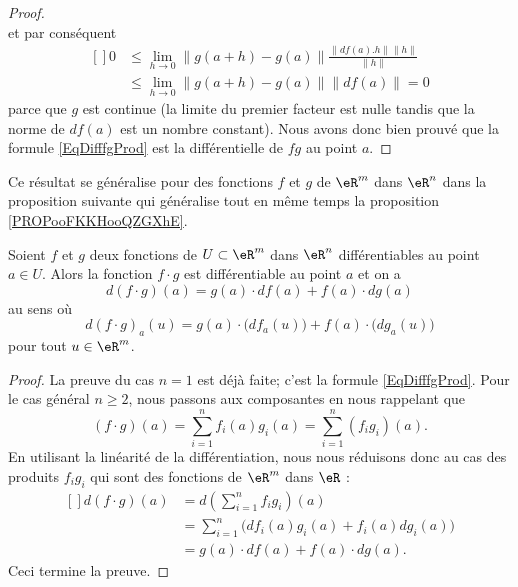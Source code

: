 \begin{proof}
\begin{equation}
	\end{equation}
	et par conséquent
	\begin{equation}
		\begin{aligned}[]
			0 & \leq\lim_{h\to 0} \| g(a+h)-g(a) \|\frac{ \| df(a).h \|\| h \| }{ \| h \| } \\
			  & \leq \lim_{h\to 0} \| g(a+h)-g(a) \|\| df(a) \|=0
		\end{aligned}
	\end{equation}
	parce que \( g\) est continue (la limite du premier facteur est nulle tandis que la norme de \( df(a)\) est un nombre constant). Nous avons donc bien prouvé que la formule \eqref{EqDifffgProd} est la différentielle de \( fg\) au point \( a\).
\end{proof}


Ce résultat se généralise pour des fonctions \( f\) et \( g\) de \( \eR^m\) dans \( \eR^n\) dans la proposition suivante qui généralise tout en même temps la proposition \ref{PROPooFKKHooQZGXhE}.
\begin{proposition}
	Soient \( f\) et \( g\) deux fonctions de \( U\subset\eR^m\) dans \( \eR^n\) différentiables au point \( a\in U\). Alors la fonction \( f\cdot g\) est différentiable  au point \( a\) et on a
	\begin{equation}
		d(f\cdot g)(a)=g(a)\cdot df(a)+f(a)\cdot dg(a)
	\end{equation}
	au sens où
	\begin{equation}		\label{Eqdfcdotgexpl}
		d(f\cdot g)_a(u)=g(a)\cdot\big( df_a(u) \big)+f(a)\cdot\big( dg_a(u) \big)
	\end{equation}
	pour tout \( u\in\eR^m\).
\end{proposition}

\begin{proof}
	La preuve du cas \( n=1\) est déjà faite; c'est la formule \eqref{EqDifffgProd}. Pour le cas général \( n\geq 2\), nous passons aux composantes en nous rappelant que
	\begin{equation}
		(f\cdot g)(a)=\sum_{i=1}^nf_i(a)g_i(a)=\sum_{i=1}^n(f_ig_i)(a).
	\end{equation}
	En utilisant la linéarité de la différentiation, nous nous réduisons donc au cas des produits \( f_ig_i\) qui sont des fonctions de \( \eR^m\) dans \( \eR\) :
	\begin{equation}
		\begin{aligned}[]
			d(f\cdot g)(a) & =d\left( \sum_{i=1}^n f_ig_i \right)(a)              \\
			               & =\sum_{i=1}^n\big( df_i(a)g_i(a)+f_i(a)dg_i(a) \big) \\
			               & =g(a)\cdot df(a)+f(a)\cdot dg(a).
		\end{aligned}
	\end{equation}
	Ceci termine la preuve.
\end{proof}

